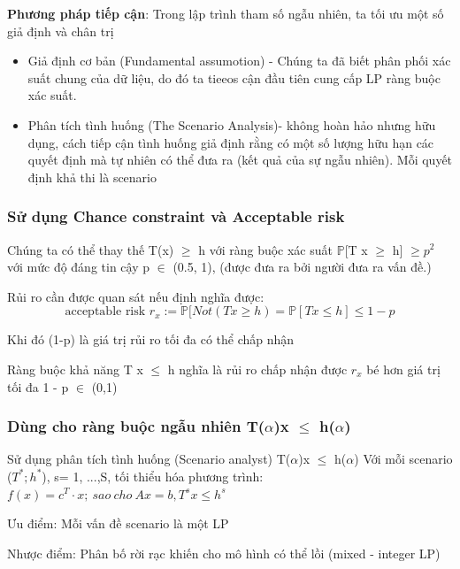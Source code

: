 \documentclass[a4paper]{article}
\begin{document}
{\textbf{Phương pháp tiếp cận}: Trong lập trình tham số ngẫu nhiên, ta tối ưu một số giả định và chân trị}
\begin{itemize}
    \item Giả định cơ bản (Fundamental assumotion) - Chúng ta đã biết phân phối xác suất chung của dữ liệu, do đó ta tieeos cận đầu tiên cung cấp LP ràng buộc xác suất.
    \item Phân tích tình huống (The Scenario Analysis)- không hoàn hảo nhưng hữu dụng, cách tiếp cận tình huống giả định rằng có một số lượng hữu hạn các quyết định mà tự nhiên có thể đưa ra (kết quả của sự ngẫu nhiên). Mỗi quyết định khả thi là scenario
\end{itemize}
\subsubsection{Sử dụng Chance constraint và Acceptable risk}
{Chúng ta có thể thay thế T(x) $\geq$ h với ràng buộc xác suất $\mathbb{P}$[T x $\geq$ h] $\geq p^2$ với mức độ đáng tin cậy p $\in$ (0.5, 1), (được đưa ra bởi người đưa ra vấn đề.)}

{Rủi ro cần được quan sát nếu định nghĩa được:}
\[\text{acceptable risk } r_x := \mathbb{P}[Not (Tx \ge h) = \mathbb{P}[Tx \le h] \le 1 - p\]

{Khi đó (1-p) là giá trị rủi ro tối đa có thể chấp nhận}

{Ràng buộc khả năng T x $\leq$ h nghĩa là rủi ro chấp nhận được $r_x$ bé hơn giá trị tối đa 1 - p $\in$ (0,1) }
\subsubsection{Dùng cho ràng buộc ngẫu nhiên T($\alpha$)x $\leq$ h($\alpha$)}
{ Sử dụng phân tích tình huống (Scenario analyst) T($\alpha$)x $\leq$ h($\alpha$)}
{Với mỗi scenario ($T^*;h^*$), s= 1, ...,S}, tối thiểu hóa phương trình: ${f(x) = c^T \cdot x;\ sao \ cho \ Ax = b, T^sx \le h^s}$

{Ưu điểm: Mỗi vấn đề scenario là một LP}

{Nhược điểm: Phân bố rời rạc khiến cho mô hình có thể lồi (mixed - integer LP)}
\end{document}

